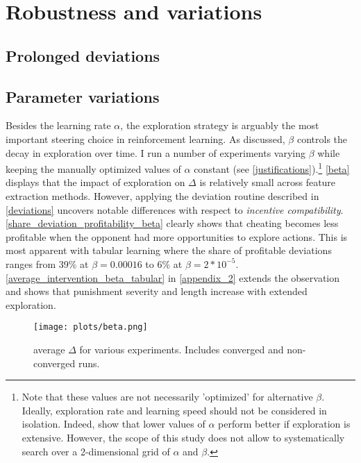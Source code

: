 \section{Robustness and variations}\label{robustness}


\subsection{Prolonged deviations}



\subsection{Parameter variations}\label{vary_parameter}

Besides the learning rate $\alpha$, the exploration strategy is arguably the most important steering choice in reinforcement learning. As discussed, $\beta$ controls the decay in exploration over time. I run a number of experiments varying $\beta$ while keeping the manually optimized values of $\alpha$ constant (see \autoref{justifications}).\footnote{Note that these values are not necessarily 'optimized' for alternative $\beta$. Ideally, exploration rate and learning speed should not be considered in isolation. Indeed, \textcite{calvano_algorithmic_2018} show that lower values of $\alpha$ perform better if exploration is extensive. However, the scope of this study does not allow to systematically search over a 2-dimensional grid of $\alpha$ and $\beta$.} \autoref{beta} displays that the impact of exploration on $\Delta$ is relatively small across feature extraction methods. However, applying the deviation routine described in \autoref{deviations} uncovers notable differences with respect to \emph{incentive compatibility}. \autoref{share_deviation_profitability_beta} clearly shows that cheating becomes less profitable when the opponent had more opportunities to explore actions. This is most apparent with tabular learning where the share of profitable deviations ranges from 39\% at $\beta = 0.00016$ to 6\% at $\beta= 2*10^{-5}$. \autoref{average_intervention_beta_tabular} in \autoref{appendix_2} extends the observation and shows that punishment severity and length increase with extended exploration.

\begin{figure}
	\texttt{[image: plots/beta.png]}
	\caption{average $\Delta$ for various experiments. Includes converged and non-converged runs.}
	\label{beta}
\end{figure}



